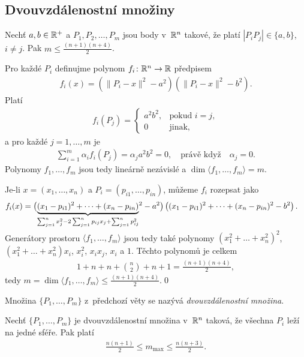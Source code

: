 \subsection{Dvouvzdálenostní množiny}


\vt Nechť $a,b\in\mathbb{R}^+$ a $P_1, P_2, \dots, P_m$ jsou body v~$\mathbb{R}^n$ takové, že platí $|P_iP_j| \in\{a,b\}$, $i\neq j$. Pak $m \leq \frac{(n+1)(n+4)}2$.

\dk Pro každé $P_i$ definujme polynom $f_i\colon\mathbb{R}^n\rightarrow\mathbb{R}$ předpisem
\begin{align}
f_i(x) = (\|P_i-x\|^2-a^2)(\|P_i-x\|^2-b^2).
\end{align}
Platí
\begin{align}
f_i(P_j)=\begin{cases}a^2b^2,&\text{pokud }i=j,\\0&\text{jinak,}\end{cases}
\end{align}
a pro každé $j=1,\dots,m$ je
\begin{align}
\sum_{i=1}^m\alpha_if_i(P_j)=\alpha_ja^2b^2=0,\quad\text{právě když}\quad\alpha_j=0.
\end{align}
Polynomy $f_1,\dots,f_m$ jsou tedy lineárně nezávislé a $\dim \langle f_1,\dots,f_m\rangle=m$.

Je-li $x=(x_1,\dots,x_n)$ a $P_i=(p_{i1},\dots,p_{in})$, můžeme $f_i$ rozepsat jako
\begin{align}
f_i(x)&= \left(\smash{\underbrace{(x_1-p_{i1})^2+\dots+(x_n-p_{in})}_{\sum_{j=1}^nx_j^2-2\sum_{j=1}^np_{ij}x_j+\sum_{j=1}^np_{ij}^2}}^2-a^2\right)\left((x_1-p_{i1})^2+\dots+(x_n-p_{in})^2-b^2\right)\vphantom{\underbrace{x}_{\sum_{i=1}^n}}.
\end{align}
Generátory prostoru $\langle f_1,\dots,f_m\rangle$ jsou tedy také polynomy $(x_1^2+\dots+x_n^2)^2$, $(x_1^2+\dots+x_n^2)x_i$, $x_i^2$, $x_ix_j$, $x_i$ a $1$. Těchto polynomů je celkem
\begin{align}
1+n+n+\binom n2+n+1=\frac{(n+1)(n+4)}2,
\end{align}
tedy $m=\dim\langle f_1,\dots,f_m\rangle\leq\frac{(n+1)(n+4)}2$.\qed

\smallskip
Množina $\{P_1,\dots,P_m\}$ z~předchozí věty se nazývá {\it dvouvzdálenostní množina}.

\vt Nechť $\{P_1,\dots,P_m\}$ je dvouvzdálenostní množina v~$\mathbb{R}^n$ taková, že všechna $P_i$ leží na jedné sféře. Pak platí
\begin{align}
\frac{n(n+1)}2 \leq m_{\max} \leq \frac{n(n+3)}2.
\end{align}

